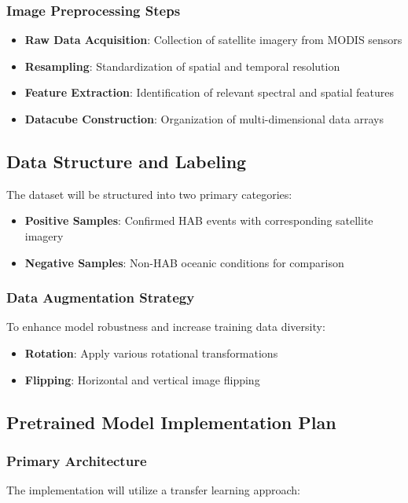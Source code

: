\documentclass[12pt]{article}
\begin{document}
\subsubsection{Image Preprocessing Steps}
\begin{itemize}
    \item \textbf{Raw Data Acquisition}: Collection of satellite imagery from MODIS sensors
    \item \textbf{Resampling}: Standardization of spatial and temporal resolution
    \item \textbf{Feature Extraction}: Identification of relevant spectral and spatial features
    \item \textbf{Datacube Construction}: Organization of multi-dimensional data arrays
\end{itemize}

\subsection{Data Structure and Labeling}

The dataset will be structured into two primary categories:
\begin{itemize}
    \item \textbf{Positive Samples}: Confirmed HAB events with corresponding satellite imagery
    \item \textbf{Negative Samples}: Non-HAB oceanic conditions for comparison
\end{itemize}

\subsubsection{Data Augmentation Strategy}
To enhance model robustness and increase training data diversity:
\begin{itemize}
    \item \textbf{Rotation}: Apply various rotational transformations
    \item \textbf{Flipping}: Horizontal and vertical image flipping
\end{itemize}

\subsection{Pretrained Model Implementation Plan}

\subsubsection{Primary Architecture}
The implementation will utilize a transfer learning approach:
\end{document}
